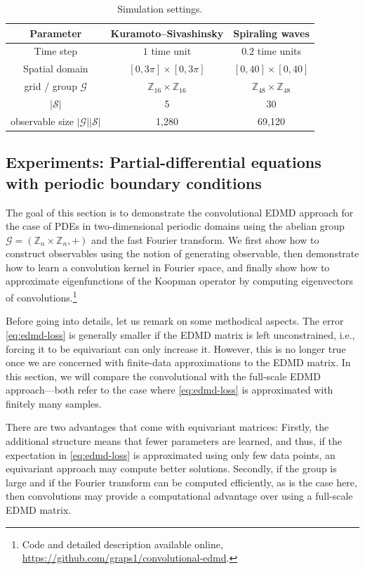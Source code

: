 \documentclass[preprint,12pt,authoryear]{elsarticle}
\newcommand{\Z}{\mathbb Z}
\newcommand\Gc{\mathcal G}
\newcommand\Sc{\mathcal S}
\begin{document}
{\begin{table}[ht]
    \centering
    \begin{tabular}{c|cc}
        Parameter & Kuramoto--Sivashinsky & Spiraling waves \\
        \hline
        Time step & $1$ time unit & $0.2$ time units \\
        Spatial domain & $[0,3\pi] \times [0,3\pi]$ & $[0,40]\times[0,40]$ \\
        grid / group $\Gc$ & $\Z_{16} \times \Z_{16}$ & $\Z_{48} \times \Z_{48}$ \\
        $|\Sc|$ & 5 & 30 \\ 
        observable size $|\Gc||\Sc|$ & 1,280 & 69,120
    \end{tabular}
    \caption{Simulation settings.}
    \label{tab:simulation-details}
\end{table}

\subsection{Experiments: Partial-differential equations with periodic boundary conditions}\label{sec:experiments}

The goal of this section is to demonstrate the convolutional EDMD approach for the case of PDEs in two-dimensional periodic domains using the abelian group $\Gc = (\Z_n \times \Z_n,+)$ and the fast Fourier transform. We first show how to construct observables using the notion of generating observable, then demonstrate how to learn a convolution kernel in Fourier space, and finally show how to approximate eigenfunctions of the Koopman operator by computing eigenvectors of convolutions.\footnote{Code and detailed description available online, \url{https://github.com/graps1/convolutional-edmd}.}

Before going into details, let us remark on some methodical aspects. The error \eqref{eq:edmd-loss} is generally smaller if the EDMD matrix is left unconstrained, i.e., forcing it to be equivariant can only increase it. However, this is no longer true once we are concerned with finite-data approximations to the EDMD matrix. In this section, we will compare the convolutional with the full-scale EDMD approach---both refer to the case where \eqref{eq:edmd-loss} is approximated with finitely many samples.

There are two advantages that come with equivariant matrices: Firstly, the additional structure means that fewer parameters are learned, and thus, if the expectation in \eqref{eq:edmd-loss} is approximated using only few data points, an equivariant approach may compute better solutions. Secondly, if the group is large and if the Fourier transform can be computed efficiently, as is the case here, then convolutions may provide a computational advantage over using a full-scale EDMD matrix.

}
\end{document}

